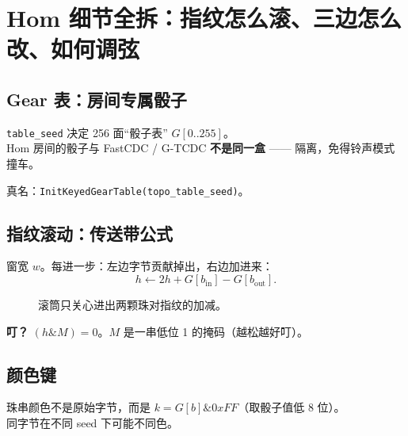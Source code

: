 \chapter{Hom 细节全拆：指纹怎么滚、三边怎么改、如何调弦}
\label{ch:hom-details}

\section{Gear 表：房间专属骰子}

\begin{metaphor}[赌场换骰]
\texttt{table\_seed} 决定 256 面``骰子表'' $G[0..255]$。\\
Hom 房间的骰子与 FastCDC / G-TCDC \textbf{不是同一盒} —— 隔离，免得铃声模式撞车。
\end{metaphor}

真名：\texttt{InitKeyedGearTable(topo\_table\_seed)}。

\section{指纹滚动：传送带公式}

窗宽 $w$。每进一步：左边字节贡献掉出，右边加进来：
\begin{equation}
h \leftarrow 2h + G[b_{\mathrm{in}}] - G[b_{\mathrm{out}}].
\end{equation}

\begin{figure}[htbp]
\centering
{}
\caption{滚筒只关心进出两颗珠对指纹的加减。}
\label{fig:gear-roll-detail}
\end{figure}

\textbf{叮？} $(h \mathbin{\&} M)=0$。$M$ 是一串低位 1 的掩码（越松越好叮）。

\section{颜色键}

珠串颜色不是原始字节，而是 $k=G[b]\mathbin{\&}0xFF$（取骰子值低 8 位）。\\
同字节在不同 seed 下可能不同色。

